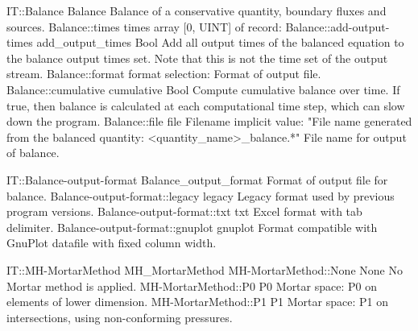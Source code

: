 \begin{RecordType}
	{IT::Balance}
	{Balance}
	{}%
	{}%
	{{{Balance of a conservative quantity, boundary fluxes and sources.}%
}}
		\RecKey
			{Balance::times}
			{times}
			{{array [0, UINT] of }{record: }}{}
			{ \ValueDefault{[]}}
			{}
		\RecKey
			{Balance::add-output-times}
			{add{\_}output{\_}times}
			{{Bool}}{}
			{ }
			{{{Add all output times of the balanced equation to the balance output times set.
Note that this is not the time set of the output stream.}%
}}
		\RecKey
			{Balance::format}
			{format}
			{{selection: }}{}
			{ }
			{{{Format of output file.}%
}}
		\RecKey
			{Balance::cumulative}
			{cumulative}
			{{Bool}}{}
			{ }
			{{{Compute cumulative balance over time.
If true, then balance is calculated at each computational time step, which can slow down the program.}%
}}
		\RecKey
			{Balance::file}
			{file}
			{{Filename}}{}
			{implicit value: "{File name generated from the balanced quantity: {\textless}quantity{\_}name{\textgreater}{\_}balance.*}"}
			{{{File name for output of balance.}%
}}
\end{RecordType}
\begin{SelectionType}
	{IT::Balance-output-format}
	{Balance{\_}output{\_}format}
	{{{Format of output file for balance.}%
}}
		\SelectionItem
			{Balance-output-format::legacy}
			{legacy}
			{{{Legacy format used by previous program versions.}%
}}
		\SelectionItem
			{Balance-output-format::txt}
			{txt}
			{{{Excel format with tab delimiter.}%
}}
		\SelectionItem
			{Balance-output-format::gnuplot}
			{gnuplot}
			{{{Format compatible with GnuPlot datafile with fixed column width.}%
}}
\end{SelectionType}
\begin{SelectionType}
	{IT::MH-MortarMethod}
	{MH{\_}MortarMethod}
	{}
		\SelectionItem
			{MH-MortarMethod::None}
			{None}
			{{{No Mortar method is applied.}%
}}
		\SelectionItem
			{MH-MortarMethod::P0}
			{P0}
			{{{Mortar space: P0 on elements of lower dimension.}%
}}
		\SelectionItem
			{MH-MortarMethod::P1}
			{P1}
			{{{Mortar space: P1 on intersections, using non-conforming pressures.}%
}}
\end{SelectionType}
